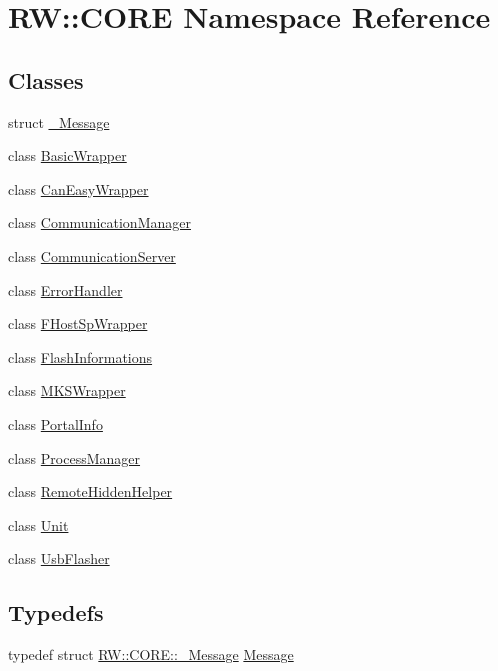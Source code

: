\hypertarget{namespace_r_w_1_1_c_o_r_e}{}\section{RW\+:\+:C\+O\+RE Namespace Reference}
\label{namespace_r_w_1_1_c_o_r_e}
\subsection*{Classes}
\begin{DoxyCompactItemize}
\item 
struct \hyperlink{struct_r_w_1_1_c_o_r_e_1_1___message}{\+\_\+\+Message}
\item 
class \hyperlink{class_r_w_1_1_c_o_r_e_1_1_basic_wrapper}{Basic\+Wrapper}
\item 
class \hyperlink{class_r_w_1_1_c_o_r_e_1_1_can_easy_wrapper}{Can\+Easy\+Wrapper}
\item 
class \hyperlink{class_r_w_1_1_c_o_r_e_1_1_communication_manager}{Communication\+Manager}
\item 
class \hyperlink{class_r_w_1_1_c_o_r_e_1_1_communication_server}{Communication\+Server}
\item 
class \hyperlink{class_r_w_1_1_c_o_r_e_1_1_error_handler}{Error\+Handler}
\item 
class \hyperlink{class_r_w_1_1_c_o_r_e_1_1_f_host_sp_wrapper}{F\+Host\+Sp\+Wrapper}
\item 
class \hyperlink{class_r_w_1_1_c_o_r_e_1_1_flash_informations}{Flash\+Informations}
\item 
class \hyperlink{class_r_w_1_1_c_o_r_e_1_1_m_k_s_wrapper}{M\+K\+S\+Wrapper}
\item 
class \hyperlink{class_r_w_1_1_c_o_r_e_1_1_portal_info}{Portal\+Info}
\item 
class \hyperlink{class_r_w_1_1_c_o_r_e_1_1_process_manager}{Process\+Manager}
\item 
class \hyperlink{class_r_w_1_1_c_o_r_e_1_1_remote_hidden_helper}{Remote\+Hidden\+Helper}
\item 
class \hyperlink{class_r_w_1_1_c_o_r_e_1_1_unit}{Unit}
\item 
class \hyperlink{class_r_w_1_1_c_o_r_e_1_1_usb_flasher}{Usb\+Flasher}
\end{DoxyCompactItemize}
\subsection*{Typedefs}
\begin{DoxyCompactItemize}
\item 
typedef struct \hyperlink{struct_r_w_1_1_c_o_r_e_1_1___message}{R\+W\+::\+C\+O\+R\+E\+::\+\_\+\+Message} \hyperlink{namespace_r_w_1_1_c_o_r_e_a571834b44d0e3fab58aa6abfe5a02988}{Message}
\end{DoxyCompactItemize}
